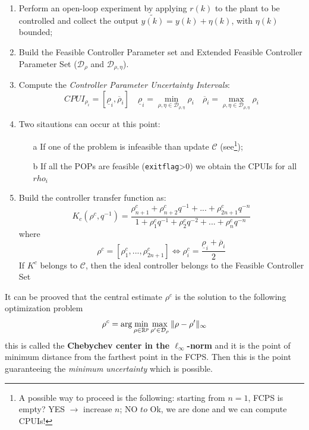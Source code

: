 \begin{enumerate}
    \itemsep-0.3em
    \item Perform an open-loop experiment by applying $r(k)$ to the plant to be controlled and collect the output $\tilde{y(k)}=y(k)+\eta(k)$, with $\eta(k)$ bounded; 
    \item Build the Feasible Controller Parameter set and Extended Feasible Controller Parameter Set ($\mathcal{D}_{\rho}$ and $\mathcal{D}_{\rho,\eta}$).
    \item Compute the \textit{Controller Parameter Uncertainty Intervals}:
    \begin{equation}
        CPUI_{\rho_i}=[\underline{\rho}_i, \overline{\rho}_i] \quad 
        \underline{\rho}_i= \min_{\rho,\eta \in \mathcal{D}_{\rho,\eta}} \rho_i \quad
        \overline{\rho}_i= \max_{\rho,\eta \in \mathcal{D}_{\rho,\eta}} \rho_i 
    \end{equation}
    \vspace{-0.2cm}
    \item Two sitautions can occur at this point:
    \vspace{-0.3cm}
    \begin{itemize}
        \itemsep-0.3em
        \item[a] If one of the problem is infeasible than update $\mathcal{C}$  (see\footnote{
            A possible way to proceed is the following: starting from $n=1$, FCPS is empty? YES $\to$ increase $n$; NO $to$ Ok, we are done and we can compute CPUIs!
        });
        \item[b] If all the POPs are feasible (\texttt{exitflag}>0) we obtain the CPUIs for all $rho_i$
    \end{itemize}
    \item Build the controller transfer function as:
    \begin{equation}
        K_c(\rho^c,q^{-1})=\frac{\rho^c_{n+1} + \rho^c_{n+2}q^{-1}+...+\rho^c_{2n+1} q^{-n}}
        {1+\rho_1^c q^{-1}+\rho_2^c q^{-2}+...+\rho_n^c q^{-n}}
    \end{equation}
    where
    \begin{equation}
        \rho^c =[\rho^c_1,..., \rho^c_{2n+1}] \iff \rho_i^c = \frac{\underline{\rho}_i+\overline{\rho}_i}{2}
    \end{equation}
    \noindent
    If $K^c$ belongs to $\mathcal{C}$, then the ideal controller belongs to the Feasible Controller Set
\end{enumerate}

\begin{remark}
    It can be prooved that the central estimate $\rho^c$ is the solution to the following optimization problem
    \begin{equation}
        \large
        \rho^c = \arg \min_{\rho\in\mathbb{R}^p} \max_{\rho'\in\mathcal{D}_{\rho}} {
            \Vert \rho-\rho'\Vert_\infty
        }
    \end{equation}
    this is called the \textbf{Chebychev center in the $\ell_\infty$-norm} and it is the point of minimum distance from the farthest point in the FCPS. Then this is the point guaranteeing the \textit{minimum uncertainty} which is possible.
\end{remark}

